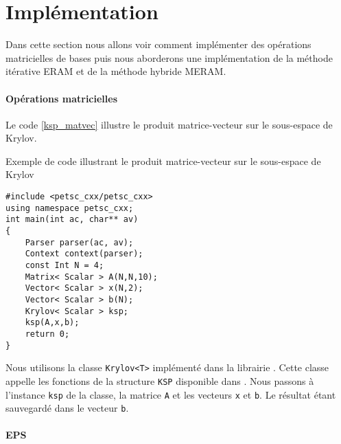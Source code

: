 %

\section{Implémentation}

Dans cette section nous allons voir comment implémenter des opérations matricielles de bases puis nous aborderons une implémentation de la méthode itérative ERAM et de la méthode hybride MERAM.

\paragraph{Opérations matricielles}

Le code \ref{ksp_matvec} illustre le produit matrice-vecteur sur le sous-espace de Krylov.

\begin{algorithm}[h]
  \caption{Exemple de code illustrant le produit matrice-vecteur sur le sous-espace de Krylov}
  \label{ksp_matvec}
\begin{verbatim}
#include <petsc_cxx/petsc_cxx>
using namespace petsc_cxx;
int main(int ac, char** av)
{
    Parser parser(ac, av);
    Context context(parser);
    const Int N = 4;
    Matrix< Scalar > A(N,N,10);
    Vector< Scalar > x(N,2);
    Vector< Scalar > b(N);
    Krylov< Scalar > ksp;
    ksp(A,x,b);
    return 0;
}
\end{verbatim}
\end{algorithm}

Nous utilisons la classe \verb#Krylov<T># implémenté dans la librairie \petscx. Cette classe appelle les fonctions de la structure \verb#KSP# disponible dans \petsc. Nous passons à l'instance \verb#ksp# de la classe, la matrice \verb#A# et les vecteurs \verb#x# et \verb#b#. Le résultat étant sauvegardé dans le vecteur \verb#b#.

\paragraph{EPS}

